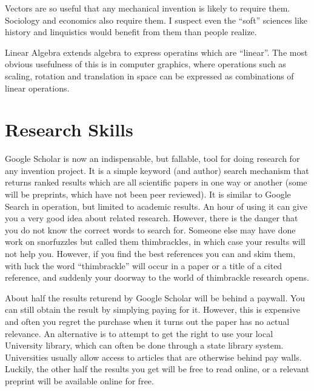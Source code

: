 \documentclass[
	fontsize=10pt, %
	twoside=false, %
	secnumdepth=1, %
]{kaobook}
\begin{document}
Vectors are so useful that any mechanical invention is
likely to require them. Sociology and economics also require them.
I suspect even the ``soft'' sciences
like history and linquistics would benefit from them than people realize.

Linear Algebra extends algebra to express operatins which are ``linear''.
The most obvious usefulness of this is in computer graphics, where operations
such as scaling, rotation and translation in space can be expressed as
combinations of linear operations.

\section{Research Skills}
Google Scholar is now an indispensable, but fallable, tool for doing research for
any invention project.
It is a simple keyword (and author) search mechanism that returns ranked results
which are all scientific papers in one way or another (some will be preprints, which have not been peer reviewed). It is similar to Google Search in operation,
but limited to academic results.
An hour of using it can give you a very good idea about related research.
However, there is the danger that you do not know the correct words to
search for.
Someone else may have done work on snorfuzzles but called them thimbrackles,
in which case your results will not help you. However, if you find the
best references you can and skim them, with luck the word ``thimbrackle''
will occur in a paper or a title of a cited reference, and suddenly
your doorway to the world of thimbrackle research opens.

About half the results returend by Google Scholar will be behind a paywall.
You can still obtain the result by simplying paying for it. However, this
is expensive and often you regret the purchase when it turns out the
paper has no actual relevance. An alternative is to attempt to get
the right to use your local University library, which can often be
done through a state library system. Universities usually allow
access to articles that are otherwise behind pay walls.
Luckily, the other half the results you get will be free to read online,
or a relevant preprint will be available online for free.
\end{document}
